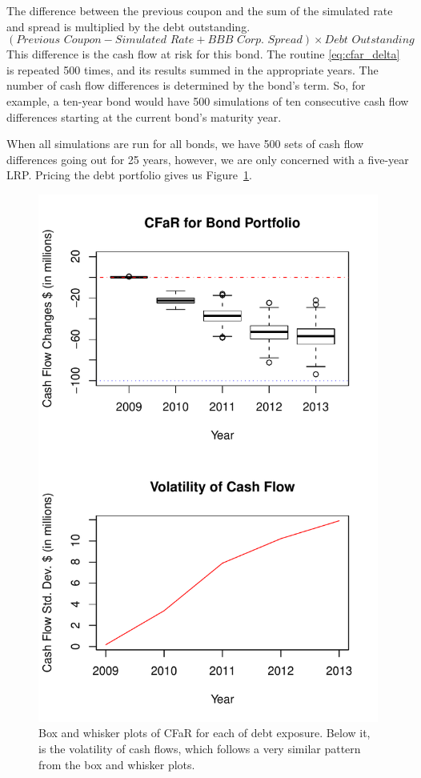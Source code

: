 \documentclass[11pt,twoside]{article}
\numberwithin{equation}{section}
\begin{document}
The difference between the previous coupon and the sum of the simulated rate and spread is multiplied by the debt outstanding. 
\begin{equation}
(\textit{Previous Coupon}  - \textit{Simulated Rate} + \textit{BBB Corp. Spread}) \times \textit{Debt Outstanding}
\label{eq:cfar_delta}
\end{equation}
This difference is the cash flow at risk for this bond. The routine \eqref{eq:cfar_delta} is repeated 500 times, and its results summed in the appropriate years. The number of cash flow differences is determined by the bond's term. So, for example, a ten-year bond would have 500 simulations of ten consecutive cash flow differences starting at the current bond's maturity year.

When all simulations are run for all bonds, we have 500 sets of cash flow differences going out for 25 years, however, we are only concerned with a five-year LRP. Pricing the debt portfolio gives us Figure~\ref{figure:box_plots}.
\begin{figure}[thb]
  \centering
  \includegraphics[scale=.65]{box_plots}
  \caption{Box and whisker plots of CFaR for each of debt exposure. Below it, is the volatility of cash flows, which follows a very similar pattern from the box and whisker plots.}
  \label{figure:box_plots}
\end{figure}
\end{document}
